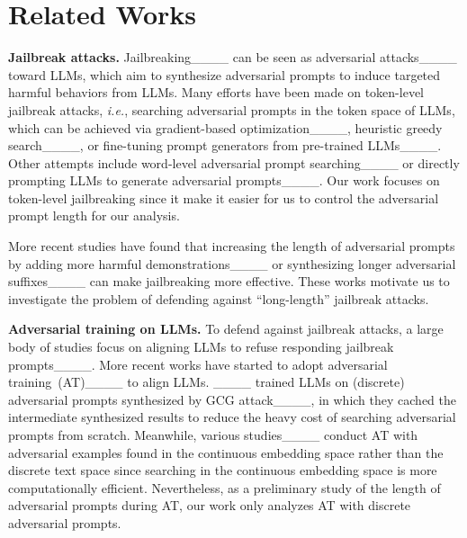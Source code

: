 \section{Related Works}
\label{sec:related-works}



\textbf{Jailbreak attacks.}
Jailbreaking____ can be seen as adversarial attacks____ toward LLMs, which aim to synthesize adversarial prompts to induce targeted harmful behaviors from LLMs.
Many efforts have been made on token-level jailbreak attacks, {\it i.e.}, searching adversarial prompts in the token space of LLMs, which can be achieved via gradient-based optimization____, heuristic greedy search____, or fine-tuning prompt generators from pre-trained LLMs____.
Other attempts include word-level adversarial prompt searching____ or directly prompting LLMs to generate adversarial prompts____.
Our work focuses on token-level jailbreaking since it make it easier for us to control the adversarial prompt length for our analysis.



More recent studies have found that increasing the length of adversarial prompts by adding more harmful demonstrations____ or synthesizing longer adversarial suffixes____ can make jailbreaking more effective.
These works motivate us to investigate the problem of defending against ``long-length'' jailbreak attacks.






\textbf{Adversarial training on LLMs.}
To defend against jailbreak attacks, a large body of studies focus on aligning LLMs to refuse responding jailbreak prompts____.
More recent works have started to adopt adversarial training~(AT)____ to align LLMs.
____ trained LLMs on (discrete) adversarial prompts synthesized by GCG attack____, in which they cached the intermediate synthesized results to reduce the heavy cost of searching adversarial prompts from scratch.
Meanwhile, various studies____ conduct AT with adversarial examples found in the continuous embedding space rather than the discrete text space since searching in the continuous embedding space is more computationally efficient.
Nevertheless, as a preliminary study of the length of adversarial prompts during AT, our work only analyzes AT with discrete adversarial prompts.



